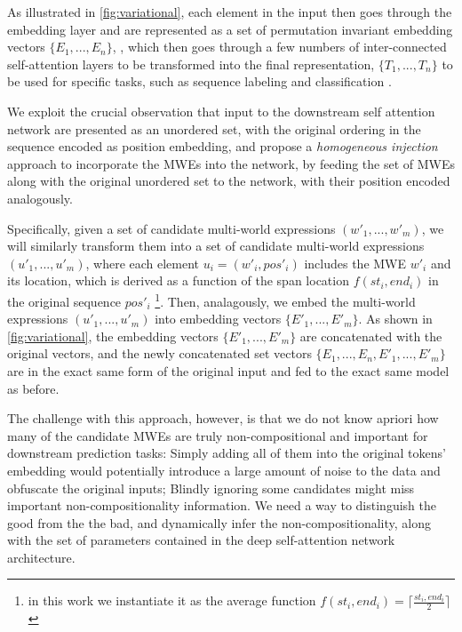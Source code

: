 As illustrated in \autoref{fig:variational}, each element in the input then goes through the embedding layer and are represented as a set of permutation invariant embedding vectors $\{E_1, ..., E_n\}$, 
\cite{vaswani2017attention}, 
which then goes through a few numbers of inter-connected self-attention layers to be transformed into the final representation, 
$\{T_1, ..., T_n\}$ to be used for specific tasks, such as sequence labeling and classification \cite{devlin2018bert}.

We exploit the crucial observation that input to the downstream self attention network are presented as an unordered set, with the original ordering in the sequence encoded as position embedding,
and propose a \textit{homogeneous injection} approach to incorporate the MWEs into the network, by feeding the set of MWEs along with the original unordered set to the network, with their position encoded analogously.


Specifically, given a set of candidate multi-world expressions $(w'_1, ..., w'_m)$, 
we will similarly transform them into a set of candidate multi-world expressions $(u'_1, ..., u'_m)$, where each element $u_i=(w'_i, pos'_i)$ includes the MWE $w'_i$ and its location, which is derived as a function of the span location $f(st_i, end_i)$ in the original sequence $pos'_i$ \footnote{in this work we instantiate it as the average function $f(st_i, end_i) = \lceil \frac{st_i, end_i}{2} \rceil $}.
Then, analagously, we embed the multi-world expressions $(u'_1, ..., u'_m)$ into embedding vectors $\{E'_1, ..., E'_m\}$.
As shown in \autoref{fig:variational}, the embedding vectors $\{E'_1, ..., E'_m\}$ are concatenated with the original vectors, and the newly concatenated set vectors 
$\{E_1, ..., E_n, E'_1, ..., E'_m\}$ are in the exact same form of the original input and fed to the exact same model as before.

The challenge with this approach, however, is that we do not know apriori how many of the candidate MWEs are truly non-compositional and  important for downstream prediction tasks:
Simply adding all of them into the original tokens' embedding would potentially introduce a large amount of noise to the data and obfuscate the original inputs; Blindly ignoring some candidates might miss important non-compositionality information.
We need a way to distinguish the good from the the bad, and dynamically infer the non-compositionality, along with the set of parameters contained in the deep self-attention network architecture.

